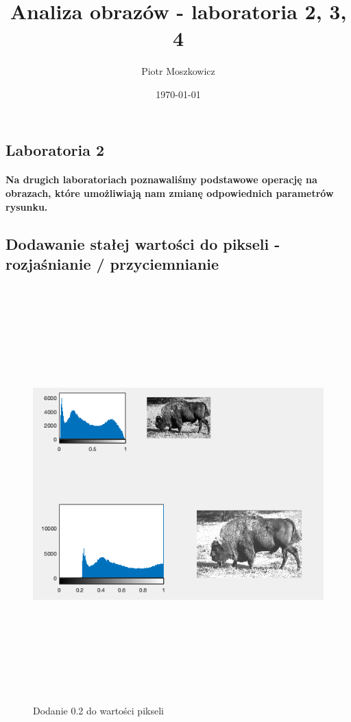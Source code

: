 \documentclass[a4paper,12pt]{article}
\begin{document}
\title{Analiza obrazów - laboratoria 2, 3, 4}
\author{Piotr Moszkowicz} 
\date{\today}
\maketitle
{}

\newpage
\begin{justify}
\tableofcontents
\newpage
{}

\section{Laboratoria 2}

\paragraph{Na drugich laboratoriach poznawaliśmy podstawowe operację na obrazach, które umożliwiają nam zmianę odpowiednich parametrów rysunku.}

\subsection{Dodawanie stałej wartości do pikseli - rozjaśnianie / przyciemnianie}

\begin{figure}[h]
\centering
\includegraphics[width=18cm, height=16cm]{1}
\caption{Dodanie 0.2 do wartości pikseli}
\end{figure}


\end{justify}
\end{document}

